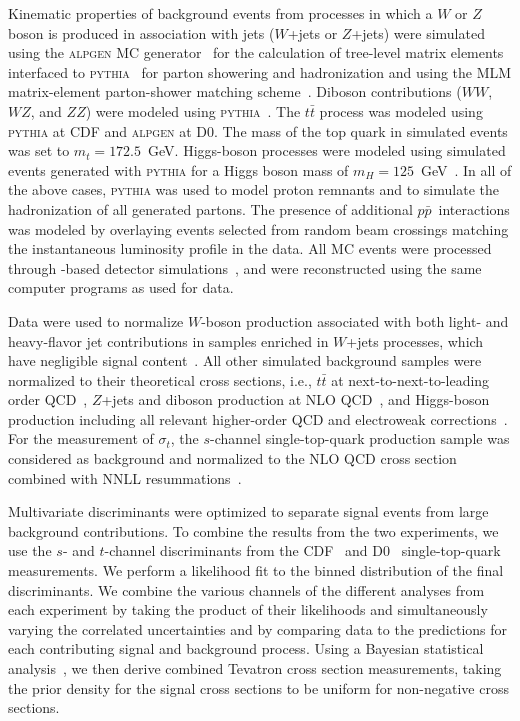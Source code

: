 \documentclass[aps,prl,twocolumn,showpacs,superscriptaddress,groupedaddress]{revtex4}  %
\newcommand{\ttbar}     {\mbox{$t\bar{t}$}\xspace}
\newcommand{\ppbar}     {\mbox{$p\bar{p}$}\xspace}
\newcommand{\pythia}    {\mbox{\textsc{pythia}}}
\newcommand{\geant}     {{\sc{geant}}}
\newcommand{\alpgen}    {\mbox{\textsc{alpgen}}}
\begin{document}
Kinematic properties of background events from processes in which a
$W$ or $Z$ boson is produced in association with jets ($W$+jets or
$Z$+jets) were simulated using the {\alpgen} MC
generator~\cite{alpgen} for the calculation of tree-level matrix elements 
interfaced to {\pythia}~\cite{pythia} for parton showering and
hadronization and using the MLM matrix-element parton-shower matching
scheme~\cite{MLM}. 
Diboson contributions ($WW$, $WZ$,
and $ZZ$) were modeled using {\pythia}~\cite{pythia}. The {\ttbar}
process was modeled using {\pythia} at CDF and {\alpgen} at D0. The
mass of the top quark in simulated events was set to $m_t=172.5$~GeV. 
Higgs-boson processes were modeled using simulated events generated
with {\pythia} for a Higgs boson mass of
$m_H=125$~GeV~\cite{atlas-higgs-mass,cms-higgs-mass1,cms-higgs-mass2}.  
In all of the above cases, {\pythia} was used to model proton remnants
and to simulate the hadronization of all generated partons.  The
presence of additional \ppbar\ interactions was modeled by overlaying
events selected from random beam crossings matching the instantaneous
luminosity profile in the data. All MC events were processed through
{\geant}-based detector simulations~\cite{geant}, and were reconstructed
using the same computer programs as used for data. 

Data were used to normalize $W$-boson production associated with
both light- and heavy-flavor jet contributions in samples enriched in
$W$+jets processes, which have negligible signal
content~\cite{d0_schannel,cdf-prd-2010,cdf_schannel_MET}.  All other
simulated background samples were normalized to their theoretical
cross sections, i.e., {\ttbar} at next-to-next-to-leading order
QCD~\cite{ttbar-xsec}, $Z$+jets and diboson production at NLO
QCD~\cite{mcfm}, and Higgs-boson production including all relevant
higher-order QCD and electroweak corrections~\cite{higgs-xsec}. For
the measurement of $\sigma_t$, the $s$-channel single-top-quark
production sample was considered as background and normalized to the
NLO QCD cross section combined with NNLL
resummations~\cite{schannel-kidonakis}. 
 




Multivariate discriminants were optimized to separate signal events from
large background contributions. To combine the results from the two
experiments, we use the $s$- and $t$-channel discriminants from the
CDF~\cite{cdf_schannel} and D0~\cite{d0_schannel} single-top-quark
measurements. We perform a likelihood fit to the binned distribution
of the final discriminants. We combine the various channels of the
different analyses from each experiment by taking the product of their
likelihoods and simultaneously varying the correlated uncertainties
and by comparing data to the predictions for each contributing signal
and background process. Using a Bayesian statistical
analysis~\cite{bayes-limits}, we then derive combined Tevatron cross
section measurements, taking the prior density for the signal cross
sections to be uniform for non-negative cross sections.  
\end{document}
